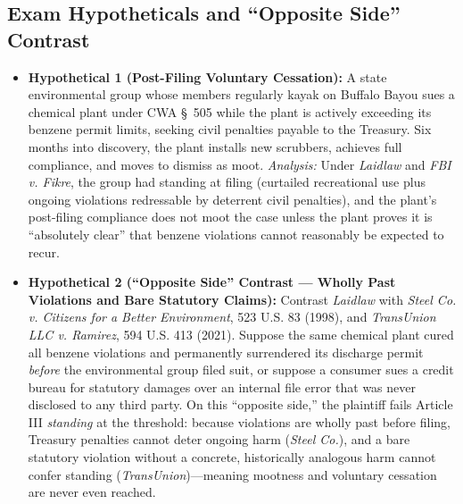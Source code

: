 \documentclass[12pt]{article}
\begin{document}
\subsection{Exam Hypotheticals and ``Opposite Side'' Contrast}
\begin{itemize}
  \item \textbf{Hypothetical 1 (Post-Filing Voluntary Cessation):} A state environmental group whose members regularly kayak on Buffalo Bayou sues a chemical plant under CWA \S~505 while the plant is actively exceeding its benzene permit limits, seeking civil penalties payable to the Treasury. Six months into discovery, the plant installs new scrubbers, achieves full compliance, and moves to dismiss as moot. \textit{Analysis:} Under \textit{Laidlaw} and \textit{FBI v. Fikre}, the group had standing at filing (curtailed recreational use plus ongoing violations redressable by deterrent civil penalties), and the plant's post-filing compliance does not moot the case unless the plant proves it is ``absolutely clear'' that benzene violations cannot reasonably be expected to recur.
  \item \textbf{Hypothetical 2 (``Opposite Side'' Contrast --- Wholly Past Violations and Bare Statutory Claims):} Contrast \textit{Laidlaw} with \textit{Steel Co. v. Citizens for a Better Environment}, 523 U.S. 83 (1998), and \textit{TransUnion LLC v. Ramirez}, 594 U.S. 413 (2021). Suppose the same chemical plant cured all benzene violations and permanently surrendered its discharge permit \textit{before} the environmental group filed suit, or suppose a consumer sues a credit bureau for statutory damages over an internal file error that was never disclosed to any third party. On this ``opposite side,'' the plaintiff fails Article III \textit{standing} at the threshold: because violations are wholly past before filing, Treasury penalties cannot deter ongoing harm (\textit{Steel Co.}), and a bare statutory violation without a concrete, historically analogous harm cannot confer standing (\textit{TransUnion})---meaning mootness and voluntary cessation are never even reached.
\end{itemize}
\end{document}
